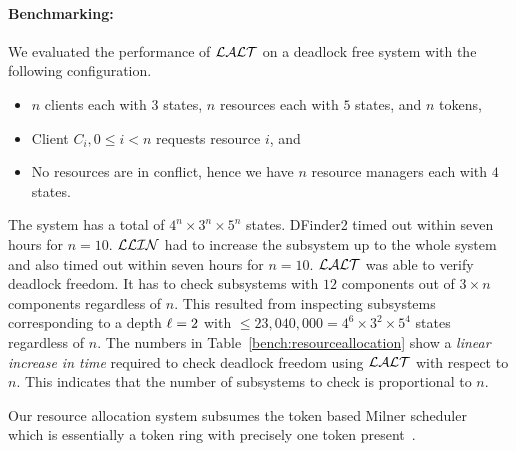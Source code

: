 \begin{table}
\label{bench:resourceallocation}
\end{table}

\paragraph{Benchmarking:}

We evaluated the performance of $\mathcal{LALT}$ on a deadlock free system with the following configuration. 
\begin{itemize}
\item $n$ clients each with $3$ states, $n$ resources each with $5$ states, and $n$ tokens,
\item Client $C_i, 0\leq i < n$ requests resource $i$, and 
\item No resources are in conflict, hence we have $n$ resource managers each with $4$ states. 
\end{itemize}

The system has a total of $4^n \times 3^n \times 5^n$ states. 
DFinder2 timed out within seven hours for $n=10$. 
$\mathcal{LLIN}$ had to increase the subsystem up to the whole system and also timed out within seven hours for $n=10$. 
$\mathcal{LALT}$ was able to verify deadlock freedom. It has to check subsystems with $12$ components out of $3\times n$ components regardless of $n$. 
This resulted from inspecting subsystems corresponding to a depth $\ell=2$ with $\leq 23,040,000=4^{6} \times 3^2\times 5^4$ states regardless of $n$.
The numbers in Table~\ref{bench:resourceallocation} show a
\emph{linear increase in time} required to check deadlock freedom 
using $\mathcal{LALT}$ with respect to $n$. This indicates that the number of subsystems to check is proportional to $n$. 

Our resource allocation system subsumes the token based Milner scheduler~\cite{milner} which 
is essentially a token ring with precisely one token present~\cite{AGR16}. 

